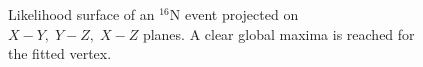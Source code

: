 \begin{figure}
	\centering
	\caption[Likelihood surface of an {$^{16}$}N event projected on planes.]{Likelihood surface of an {$^{16}$}N event projected on $X-Y,\; Y-Z,\; X-Z$ planes. A clear global maxima is reached for the fitted vertex.	\label{likelihoodSurface}}
\end{figure}

